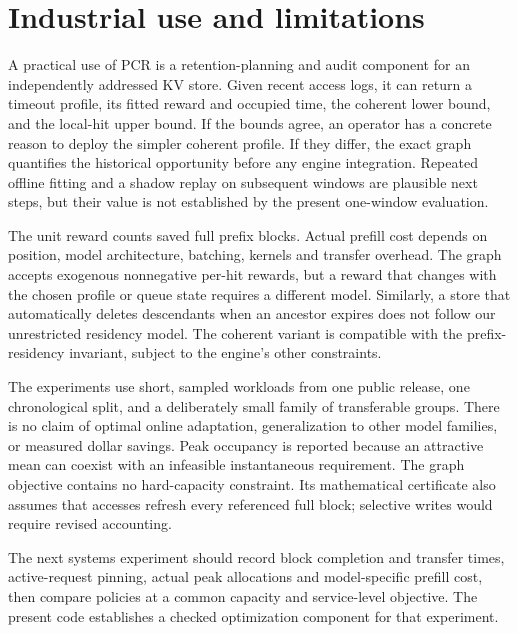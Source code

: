 \documentclass[11pt,a4paper]{article}
\begin{document}
\section{Industrial use and limitations}\label{sec:limits}
A practical use of PCR is a retention-planning and audit component for an
independently addressed KV store. Given recent access logs, it can return a
timeout profile, its fitted reward and occupied time, the coherent lower bound,
and the local-hit upper bound. If the bounds agree, an operator has a concrete
reason to deploy the simpler coherent profile. If they differ, the exact graph
quantifies the historical opportunity before any engine integration. Repeated
offline fitting and a shadow replay on subsequent windows are plausible next
steps, but their value is not established by the present one-window evaluation.

The unit reward counts saved full prefix blocks. Actual prefill cost depends on
position, model architecture, batching, kernels and transfer overhead. The graph
accepts exogenous nonnegative per-hit rewards, but a reward that changes with the
chosen profile or queue state requires a different model. Similarly, a store
that automatically deletes descendants when an ancestor expires does not follow
our unrestricted residency model. The coherent variant is compatible with the
prefix-residency invariant, subject to the engine's other constraints.

The experiments use short, sampled workloads from one public release, one
chronological split, and a deliberately small family of transferable groups.
There is no claim of optimal online adaptation, generalization to other model
families, or measured dollar savings. Peak occupancy is reported because an
attractive mean can coexist with an infeasible instantaneous requirement. The
graph objective contains no hard-capacity constraint. Its mathematical certificate
also assumes that accesses refresh every referenced full block; selective writes
would require revised accounting.

The next systems experiment should record block completion and transfer times,
active-request pinning, actual peak allocations and model-specific prefill cost,
then compare policies at a common capacity and service-level objective. The
present code establishes a checked optimization component for that experiment.
\end{document}
